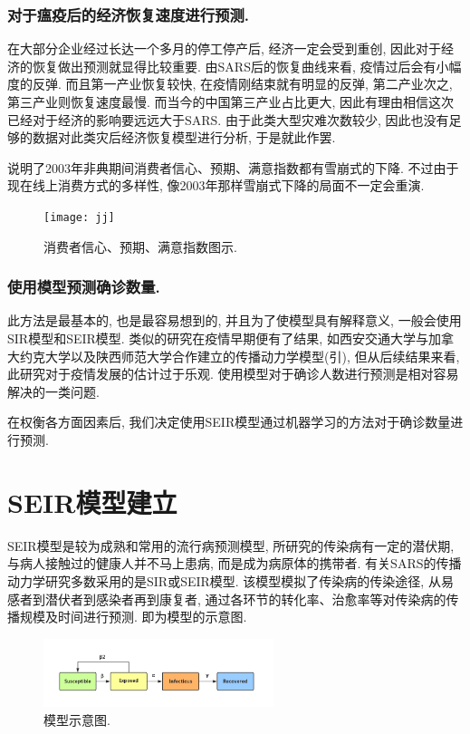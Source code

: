 \documentclass[lang=cn,11pt]{elegantpaper}
\begin{document}
\subsubsection*{对于瘟疫后的经济恢复速度进行预测. }
在大部分企业经过长达一个多月的停工停产后, 经济一定会受到重创, 因此对于经济的恢复做出预测就显得比较重要. 由SARS后的恢复曲线来看, 疫情过后会有小幅度的反弹. 而且第一产业恢复较快, 在疫情刚结束就有明显的反弹, 第二产业次之, 第三产业则恢复速度最慢. 而当今的中国第三产业占比更大, 因此有理由相信这次已经对于经济的影响要远远大于SARS. 由于此类大型灾难次数较少, 因此也没有足够的数据对此类灾后经济恢复模型进行分析, 于是就此作罢. 

 说明了2003年非典期间消费者信心、预期、满意指数都有雪崩式的下降. 不过由于现在线上消费方式的多样性, 像2003年那样雪崩式下降的局面不一定会重演. 
\begin{figure}[htbp]
  \centering
  \texttt{[image: jj]}
  \caption{消费者信心、预期、满意指数图示. \label{fig:jingji}}
\end{figure}
\subsubsection*{使用模型预测确诊数量. }
此方法是最基本的, 也是最容易想到的, 并且为了使模型具有解释意义, 一般会使用SIR模型和SEIR模型. 类似的研究在疫情早期便有了结果, 如西安交通大学与加拿大约克大学以及陕西师范大学合作建立的传播动力学模型(引), 但从后续结果来看, 此研究对于疫情发展的估计过于乐观. 使用模型对于确诊人数进行预测是相对容易解决的一类问题. 

在权衡各方面因素后, 我们决定使用SEIR模型通过机器学习的方法对于确诊数量进行预测.
\section{SEIR模型建立} 
SEIR模型是较为成熟和常用的流行病预测模型, 所研究的传染病有一定的潜伏期, 与病人接触过的健康人并不马上患病, 而是成为病原体的携带者. 有关SARS的传播动力学研究多数采用的是SIR或SEIR模型. 该模型模拟了传染病的传染途径, 从易感者到潜伏者到感染者再到康复者, 通过各环节的转化率、治愈率等对传染病的传播规模及时间进行预测.  即为模型的示意图.
\begin{figure}[htbp]
  \centering
  \includegraphics[width=0.6\textwidth]{lct}
  \caption{模型示意图. \label{fig:bu zhou}}
\end{figure}
\end{document}
